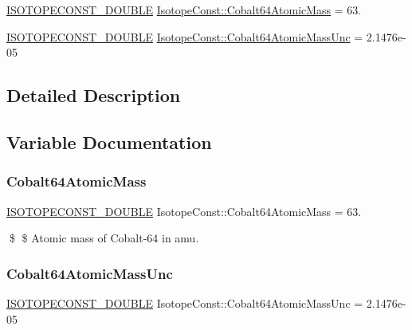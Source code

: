 \begin{DoxyCompactItemize}
\item 
\mbox{\hyperlink{group___isotope_const-_macros_ga8f45a7272ce02c0b4c65c44636ed719a}{I\+S\+O\+T\+O\+P\+E\+C\+O\+N\+S\+T\+\_\+\+D\+O\+U\+B\+LE}} \mbox{\hyperlink{group___isotope_const-_cobalt-_co64_ga44b1eef700b24a76d237c5e723e7f3f1}{Isotope\+Const\+::\+Cobalt64\+Atomic\+Mass}} = 63.
\item 
\mbox{\hyperlink{group___isotope_const-_macros_ga8f45a7272ce02c0b4c65c44636ed719a}{I\+S\+O\+T\+O\+P\+E\+C\+O\+N\+S\+T\+\_\+\+D\+O\+U\+B\+LE}} \mbox{\hyperlink{group___isotope_const-_cobalt-_co64_gab88c0549a17f9fd44c48b8c162e7ac6c}{Isotope\+Const\+::\+Cobalt64\+Atomic\+Mass\+Unc}} = 2.\+1476e-\/05
\end{DoxyCompactItemize}


\subsection{Detailed Description}


\subsection{Variable Documentation}
\mbox{\label{group___isotope_const-_cobalt-_co64_ga44b1eef700b24a76d237c5e723e7f3f1}} 
\subsubsection{\texorpdfstring{Cobalt64\+Atomic\+Mass}{Cobalt64AtomicMass}}
{\footnotesize\ttfamily \mbox{\hyperlink{group___isotope_const-_macros_ga8f45a7272ce02c0b4c65c44636ed719a}{I\+S\+O\+T\+O\+P\+E\+C\+O\+N\+S\+T\+\_\+\+D\+O\+U\+B\+LE}} Isotope\+Const\+::\+Cobalt64\+Atomic\+Mass = 63.}

\$ \$ Atomic mass of Cobalt-\/64 in amu. \mbox{\label{group___isotope_const-_cobalt-_co64_gab88c0549a17f9fd44c48b8c162e7ac6c}} 
\subsubsection{\texorpdfstring{Cobalt64\+Atomic\+Mass\+Unc}{Cobalt64AtomicMassUnc}}
{\footnotesize\ttfamily \mbox{\hyperlink{group___isotope_const-_macros_ga8f45a7272ce02c0b4c65c44636ed719a}{I\+S\+O\+T\+O\+P\+E\+C\+O\+N\+S\+T\+\_\+\+D\+O\+U\+B\+LE}} Isotope\+Const\+::\+Cobalt64\+Atomic\+Mass\+Unc = 2.\+1476e-\/05}

